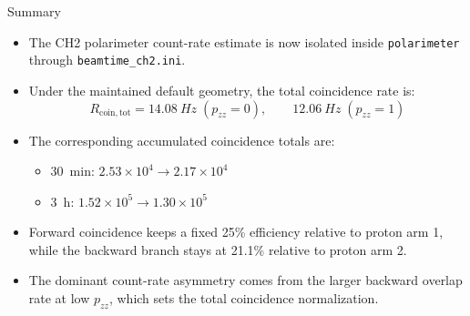 \documentclass[aspectratio=169]{beamer}
\begin{document}
\begin{frame}{Summary}
\small
\begin{itemize}
  \item The CH2 polarimeter count-rate estimate is now isolated inside \texttt{polarimeter} through \texttt{beamtime\_ch2.ini}.
  \item Under the maintained default geometry, the total coincidence rate is:
  \[
  R_{\mathrm{coin,tot}} = \SI{14.08}{Hz} \; (p_{zz}=0),
  \qquad
  \SI{12.06}{Hz} \; (p_{zz}=1)
  \]
  \item The corresponding accumulated coincidence totals are:
  \begin{itemize}
    \item \SI{30}{min}: \(2.53\times 10^4 \rightarrow 2.17\times 10^4\)
    \item \SI{3}{h}: \(1.52\times 10^5 \rightarrow 1.30\times 10^5\)
  \end{itemize}
  \item Forward coincidence keeps a fixed 25\% efficiency relative to proton arm 1, while the backward branch stays at 21.1\% relative to proton arm 2.
  \item The dominant count-rate asymmetry comes from the larger backward overlap rate at low \(p_{zz}\), which sets the total coincidence normalization.
\end{itemize}
\end{frame}
\end{document}
